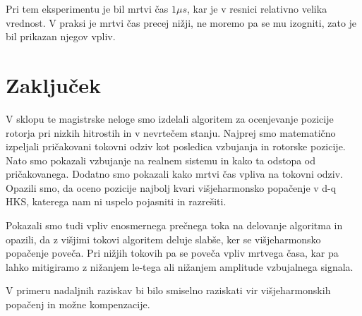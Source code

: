 \documentclass[a4paper,twoside,openright,12pt,slovene]{book}
\begin{document}
Pri tem eksperimentu je bil mrtvi čas $1 \mu s$, kar je v resnici relativno velika vrednost. V praksi je mrtvi čas precej nižji, ne moremo pa se mu izogniti, zato je bil prikazan njegov vpliv.

\chapter{Zaključek} \label{zakljucek}

V sklopu te magistrske neloge smo izdelali algoritem za ocenjevanje pozicije rotorja pri nizkih hitrostih in v nevrtečem stanju. Najprej smo matematično izpeljali pričakovani tokovni odziv kot
posledica vzbujanja in rotorske pozicije. Nato smo pokazali vzbujanje na realnem sistemu in kako ta odstopa od pričakovanega. Dodatno smo pokazali kako mrtvi čas vpliva na tokovni odziv. Opazili smo,
da oceno pozicije najbolj kvari višjeharmonsko popačenje v d-q HKS, katerega nam ni uspelo pojasniti in razrešiti. 

Pokazali smo tudi vpliv enosmernega prečnega toka na delovanje algoritma in opazili, da z višjimi tokovi algoritem deluje slabše, ker se višjeharmonsko popačenje poveča. Pri nižjih tokovih pa se
poveča vpliv mrtvega časa, kar pa lahko mitigiramo z nižanjem le-tega ali nižanjem amplitude vzbujalnega signala.

V primeru nadaljnih raziskav bi bilo smiselno raziskati vir višjeharmonskih popačenj in možne kompenzacije.

\cleardoublepage{} %




\end{document}
